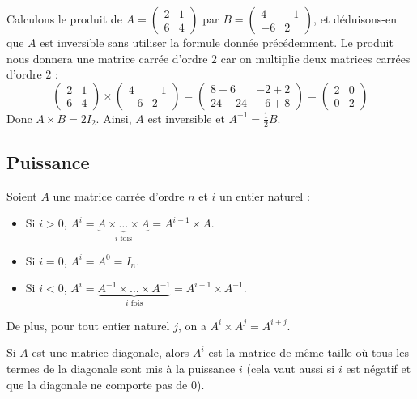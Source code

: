 	\begin{tip}[Exemple]
		Calculons le produit de $A = \begin{pmatrix}2 & 1 \\ 6 & 4\end{pmatrix}$ par $B = \begin{pmatrix}4 & -1 \\ -6 & 2\end{pmatrix}$, et déduisons-en que $A$ est inversible sans utiliser la formule donnée précédemment.
		\newpar
		Le produit nous donnera une matrice carrée d'ordre $2$ car on multiplie deux matrices carrées d'ordre $2$ :
		\[ \begin{pmatrix} 2 & 1 \\ 6 & 4 \end{pmatrix} \times \begin{pmatrix} 4 & -1 \\ -6 & 2\end{pmatrix} = \begin{pmatrix}8-6 & -2+2 \\ 24-24 & -6+8 \end{pmatrix} = \begin{pmatrix} 2 & 0 \\ 0 & 2 \end{pmatrix} \]
		Donc $A \times B = 2I_2$. Ainsi, $A$ est inversible et $A^{-1} = \frac{1}{2} B$.
	\end{tip}

	\subsection{Puissance}

	\begin{formula}
		Soient $A$ une matrice carrée d'ordre $n$ et $i$ un entier naturel :
		\begin{itemize}
			\item Si $i > 0$, $A^i = \underbrace{A \times \dots \times A}_{i \text{ fois}} = A^{i-1} \times A$.
			\item Si $i = 0$, $A^i = A^0 = I_n$.
			\item Si $i < 0$, $A^i = \underbrace{A^{-1} \times \dots \times A^{-1}}_{i \text{ fois}} = A^{i-1} \times A^{-1}$.
		\end{itemize}
		De plus, pour tout entier naturel $j$, on a $A^i \times A^j = A^{i+j}$.
	\end{formula}

	\begin{tip}
		Si $A$ est une matrice diagonale, alors $A^i$ est la matrice de même taille où tous les termes de la diagonale sont mis à la puissance $i$ (cela vaut aussi si $i$ est négatif et que la diagonale ne comporte pas de $0$).
	\end{tip}

